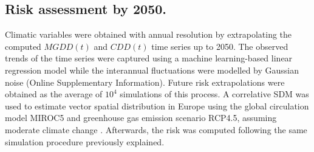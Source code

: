     \subsection{Risk assessment by 2050.}
    Climatic variables were obtained
    with annual resolution by extrapolating the computed $MGDD(t)$ and $CDD(t)$
    time series up to 2050. The observed trends of the time series were
    captured
    using a machine learning-based linear regression model while the
    interannual
    fluctuations were modelled by Gaussian noise (Online Supplementary
    Information). Future
    risk
    extrapolations were obtained as the average of $10^4$ simulations of this
process. A correlative SDM was used to estimate vector spatial distribution
in
Europe using the global circulation model MIROC5 and greenhouse gas
emission
scenario RCP4.5, assuming moderate climate change \cite{Godefroid2021}.
Afterwards, the risk was computed following the same simulation procedure
previously explained. \\
